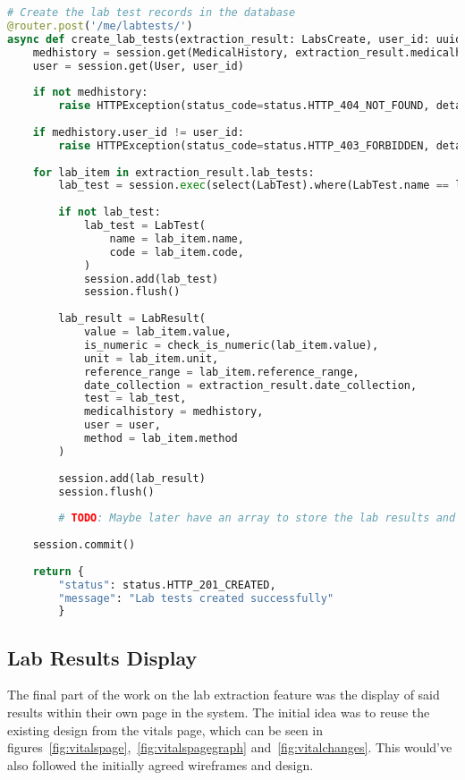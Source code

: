 \begin{lstlisting}[language=Python, caption=Lab Results Endpoint]
  # Create the lab test records in the database
@router.post('/me/labtests/')
async def create_lab_tests(extraction_result: LabsCreate, user_id: uuid.UUID = Depends(validate_session), session: Session = Depends(get_session)):
    medhistory = session.get(MedicalHistory, extraction_result.medicalhistory_id)
    user = session.get(User, user_id)
    
    if not medhistory:
        raise HTTPException(status_code=status.HTTP_404_NOT_FOUND, detail="Medical history not found")
    
    if medhistory.user_id != user_id:
        raise HTTPException(status_code=status.HTTP_403_FORBIDDEN, detail="Not authorized to access this medical history")
    
    for lab_item in extraction_result.lab_tests:
        lab_test = session.exec(select(LabTest).where(LabTest.name == lab_item.name)).first()
        
        if not lab_test:
            lab_test = LabTest(
                name = lab_item.name,
                code = lab_item.code,
            )
            session.add(lab_test)
            session.flush()
        
        lab_result = LabResult(
            value = lab_item.value,
            is_numeric = check_is_numeric(lab_item.value),
            unit = lab_item.unit,
            reference_range = lab_item.reference_range,
            date_collection = extraction_result.date_collection,
            test = lab_test,
            medicalhistory = medhistory,
            user = user,
            method = lab_item.method
        )
        
        session.add(lab_result)
        session.flush()
        
        # TODO: Maybe later have an array to store the lab results and return them all at once
        
    session.commit()
    
    return {
        "status": status.HTTP_201_CREATED,
        "message": "Lab tests created successfully"
        }
\end{lstlisting}

\subsection{Lab Results Display}

The final part of the work on the lab extraction feature was the display of said results within their own page in the system. The initial idea was to reuse the existing design from the vitals page, which can be seen in figures~\ref{fig:vitalspage},~\ref{fig:vitalspagegraph} and~\ref{fig:vitalchanges}. This would've also followed the initially agreed wireframes and design. 

